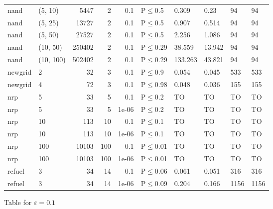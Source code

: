 \begin{longtable}{llrrrlllll}
 nand          & (5, 10)   &   	5447 &   2 & 0.1   & P$\leq$0.5   & 0.309   & 0.23    & 94     & 94     \\
 nand          & (5, 25)   &  	13727 &   2 & 0.1   & P$\leq$0.5   & 0.907   & 0.514   & 94     & 94     \\
 nand          & (5, 50)   &  	27527 &   2 & 0.1   & P$\leq$0.5   & 2.256   & 1.086   & 94     & 94     \\
 nand          & (10, 50)  & 	250402 &   2 & 0.1   & P$\leq$0.29  & 38.559  & 13.942  & 94     & 94     \\
 nand          & (10, 100) & 	502402 &   2 & 0.1   & P$\leq$0.29  & 133.263 & 43.821  & 94     & 94     \\
 newgrid       & 2         &     	32 &   3 & 0.1   & P$\leq$0.9   & 0.054   & 0.045   & 533    & 533    \\
 newgrid       & 4         &     	72 &   3 & 0.1   & P$\leq$0.98  & 0.048   & 0.036   & 155    & 155    \\
 nrp           & 5         &     	33 &   5 & 0.1   & P$\leq$0.2   & TO      & TO      & TO     & TO     \\
 nrp           & 5         &     	33 &   5 & 1e-06 & P$\leq$0.2   & TO      & TO      & TO     & TO     \\
 nrp           & 10        &    	113 &  10 & 0.1   & P$\leq$0.1   & TO      & TO      & TO     & TO     \\
 nrp           & 10        &    	113 &  10 & 1e-06 & P$\leq$0.1   & TO      & TO      & TO     & TO     \\
 nrp           & 100       &  	10103 & 100 & 0.1   & P$\leq$0.01  & TO      & TO      & TO     & TO     \\
 nrp           & 100       &  	10103 & 100 & 1e-06 & P$\leq$0.01  & TO      & TO      & TO     & TO     \\
 refuel        & 3         &     	34 &  14 & 0.1   & P$\leq$0.06  & 0.061   & 0.051   & 316    & 316    \\
 refuel        & 3         &     	34 &  14 & 1e-06 & P$\leq$0.09  & 0.204   & 0.166   & 1156   & 1156   \\
\bottomrule
\end{longtable}
\small Table for \(\varepsilon=0.1\)
